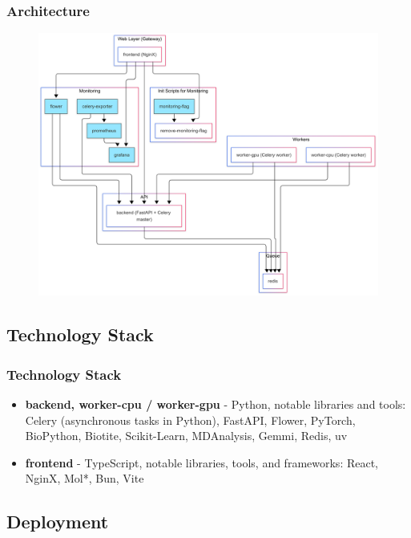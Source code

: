 \documentclass[aspectratio=169]{beamer}
\begin{document}
\begin{frame}
  \frametitle{Architecture}
  \begin{figure}
    \centering
    \includegraphics[width=\linewidth,height=0.8\textheight,keepaspectratio]{fig/architecture.png}
  \end{figure}
\end{frame}

\subsection{Technology Stack}

\begin{frame}
  \frametitle{Technology Stack}

  \begin{itemize}
    \item \textbf{backend, worker-cpu / worker-gpu} - Python, notable libraries and tools: Celery (asynchronous tasks in Python), FastAPI, Flower, PyTorch, BioPython, Biotite, Scikit-Learn, MDAnalysis, Gemmi, Redis, uv
    \item \textbf{frontend} - TypeScript, notable libraries, tools, and frameworks: React, NginX, Mol*, Bun, Vite
  \end{itemize}

\end{frame}

\subsection{Deployment}
\end{document}

